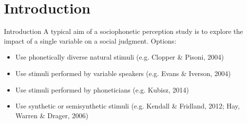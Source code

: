 \documentclass{beamer}
\begin{document}



\section{Introduction}
\begin{frame}{Introduction}
A typical aim of a sociophonetic perception study is to explore the impact of a single variable on a social judgment. 
Options:
\begin{itemize}
\item{Use phonetically diverse natural stimuli (e.g. Clopper \& Pisoni, 2004)}
\item{Use stimuli performed by variable speakers (e.g. Evans \& Iverson, 2004)}
\item{Use stimuli performed by phoneticians (e.g. Kubisz, 2014)}
\item{Use synthetic or semisynthetic stimuli (e.g. Kendall \& Fridland, 2012; Hay, Warren \& Drager, 2006)}
\end{itemize}
\end{frame}
\end{document}
